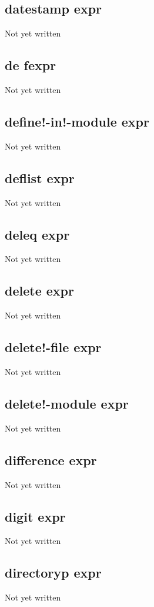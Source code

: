 \documentclass[a4paper,11pt]{article}
\begin{document}
\subsection{\ttfamily datestamp expr}
Not yet written

\subsection{\ttfamily de fexpr}
Not yet written

\subsection{\ttfamily define!-in!-module expr}
Not yet written

\subsection{\ttfamily deflist expr}
Not yet written

\subsection{\ttfamily deleq expr}
Not yet written

\subsection{\ttfamily delete expr}
Not yet written

\subsection{\ttfamily delete!-file expr}
Not yet written

\subsection{\ttfamily delete!-module expr}
Not yet written

\subsection{\ttfamily difference expr}
Not yet written

\subsection{\ttfamily digit expr}
Not yet written

\subsection{\ttfamily directoryp expr}
Not yet written
\end{document}

